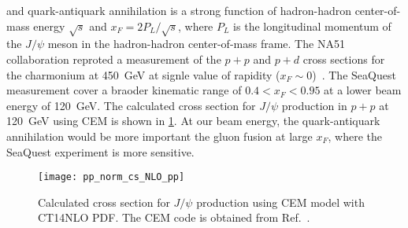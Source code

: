 \documentclass[../main.tex]{subfiles}
\begin{document}
and quark-antiquark annihilation is a strong function of hadron-hadron center-of-mass energy $\sqrt{s}$
and $x_F=2P_L/\sqrt{s}$, where $P_L$ is the longitudinal momentum of the $J/\psi$ meson in the
hadron-hadron center-of-mass frame.
The NA51 collaboration reproted a measurement of the $p+p$ and $p+d$ cross sections
for the charmonium at \SI{450}{\GeV} at signle value of rapidity ($x_F\sim 0$)~\cite{abreu1998}.
The SeaQuest measurement cover a braoder kinematic range of $0.4<x_F<0.95$ at a lower beam energy
of \SI{120}{\GeV}.
The calculated cross section for $J/\psi$ production in $p+p$ at \SI{120}{\GeV} using
CEM is shown in \cref{fig:cem_cs}.  
At our beam energy, the quark-antiquark annihilation would be more important the gluon fusion at large $x_F$, where
the SeaQuest experiment is more sensitive.
\begin{figure}[h!]
	\centering
	\texttt{[image: pp\_norm\_cs\_NLO\_pp]}
	\caption{Calculated cross section for $J/\psi$ production using CEM model with CT14NLO PDF.
		The CEM code is obtained from Ref.~\cite{mangano1993}.}
	\label{fig:cem_cs}
\end{figure}
\end{document}
